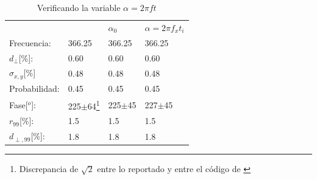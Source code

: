 \begin{table}[H]
    \begin{small}
        \begin{center}
            \begin{tabular}[c]{l|l|l|l}
                                    & \cite{Aab_2020} & $\alpha_0$   & $\alpha=2\pi f_xt_i$   \\ 
                Frecuencia:         & 366.25          &  366.25      &  366.25            \\
                $d_\perp$[\%]:      & 0.60            &  0.60        &  0.60              \\
                $\sigma_{x,y}$[\%]  & 0.48           &  0.48        &  0.48              \\ 
                Probabilidad:       & 0.45            &  0.45        &  0.45              \\
                Fase[$^o$]:               & 225$\pm$64\footnote[3]{Discrepancia de $\sqrt{2}$ entre lo reportado y entre el código de \cite{Aab_2020}} 
                                    & 225$\pm$45   &  227$\pm$45          \\
                $r_{99}$[\%]:       & 1.5           &  1.5       &  1.5             \\
                $d_{\perp,99}$[\%]:       & 1.8           &  1.8       &  1.8             \\
            \end{tabular}
        \end{center}
        \caption{Verificando la  variable $\alpha=2\pi ft$}
        \label{tab:comp_vars}
    \end{small}
\end{table}

